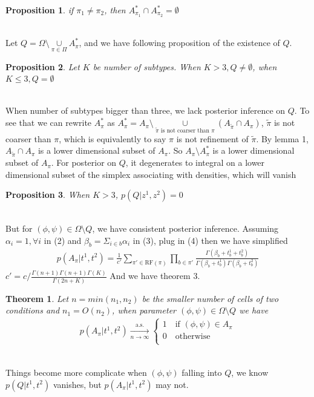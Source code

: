 \documentclass[11pt]{amsart}
\newtheorem{theorem}{Theorem}
\newtheorem{prop}{Proposition}
\begin{document}
\begin{prop}
if $\pi_1 \neq \pi_2$, then $A_{\pi_1}^*\cap A_{\pi_2}^* = \emptyset$
\end{prop}
\hfill\\
Let $Q = \Omega\setminus \underset{\pi\in \Pi}\cup A_\pi^*$, and we have following proposition of the existence of $Q$.
\begin{prop}
Let $K$ be number of subtypes. When $K >  3, Q \neq \emptyset$, when $K \leq 3, Q = \emptyset$
\end{prop}
\hfill\\
When number of subtypes bigger than three, we lack posterior inference on $Q$. To see that we can rewrite $A_\pi^*$ as $A_\pi^* = A_\pi\setminus \underset{\tilde{\pi} \text{ is not coarser than } \pi }\cup (A_{\tilde{\pi}}\cap A_\pi)$, $\tilde{\pi}$ is not coarser than $\pi$, which is equivalently to say $\pi$ is not refinement of $\tilde{\pi}$. By lemma 1, $A_{\tilde{\pi}}\cap A_\pi$ is a lower dimensional subset of $A_\pi$. So $A_\pi \setminus A_\pi^*$ is a lower dimensional subset of $A_\pi$. For posterior on $Q$, it degenerates to integral on a lower dimensional subset of the simplex associating with densities, which will vanish\\
\begin{prop}
When $K >  3$, $p(Q | z^1, z^2) = 0$
\end{prop}
\hfill\\
But for $(\phi, \psi)\in \Omega\setminus Q$, we have consistent posterior inference. Assuming $\alpha_i = 1, \forall i$ in (2) and $\beta_b = \Sigma_{i\in b} \alpha_i$ in (3), plug in (4) then we have simplified 
\begin{align}
p(A_\pi | t^1, t^2) = \frac{1}{c'}\sum_{\pi' \in \text{RF}(\pi)}\prod_{b\in \pi'}\frac{ \Gamma(\beta_b + t_b^1 + t_b^2)}{\Gamma(\beta_b + t_b^1)\Gamma(\beta_b + t_b^2)}
\end{align}
$c' = c/\frac{\Gamma(n + 1)\Gamma(n+1)\Gamma(K)}{\Gamma(2n + K)}$ And we have theorem 3.\\
\begin{theorem} Let $n = min(n_1, n_2)$ be the smaller number of cells of two conditions and $n_1 = O(n_2)$, when parameter $(\phi, \psi)\in \Omega\setminus Q $ we have 
\begin{eqnarray*}
    p(A_{\pi} | t^1, t^2) \xrightarrow[n\rightarrow\infty]{\text{a.s.}}\left\{
                \begin{array}{ll}
                 1 \quad \text{if }(\phi,\psi) \in A_\pi\\
                 0 \quad \text{otherwise}\\             
                \end{array}
              \right.
\end{eqnarray*}
\end{theorem}
\hfill\\
Things become more complicate when $(\phi, \psi)$ falling into $Q$, we know $p(Q | t^1, t^2)$ vanishes, but $p(A_\pi | t^1, t^2)$ may not. 
\end{document}
